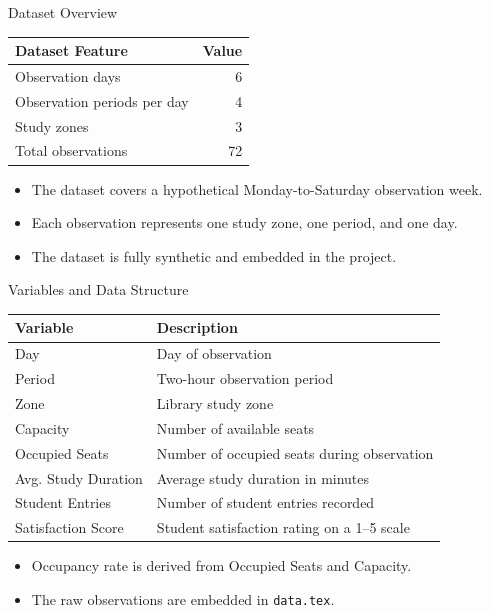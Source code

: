 \documentclass[aspectratio=169,11pt]{beamer}
\begin{document}
\begin{frame}{Dataset Overview}
	\begin{table}
		\centering
		\begin{tabular}{lr}
			\toprule
			\textbf{Dataset Feature} & \textbf{Value} \\
			\midrule
			Observation days & 6 \\
			Observation periods per day & 4 \\
			Study zones & 3 \\
			Total observations & 72 \\
			\bottomrule
		\end{tabular}
	\end{table}
	
	\vspace{0.4cm}
	
	\begin{itemize}
		\item The dataset covers a hypothetical Monday-to-Saturday observation week.
		\item Each observation represents one study zone, one period, and one day.
		\item The dataset is fully synthetic and embedded in the project.
	\end{itemize}
\end{frame}

\begin{frame}{Variables and Data Structure}
	\small
	\begin{table}
		\centering
		\begin{tabular}{p{3.2cm}p{6.8cm}}
			\toprule
			\textbf{Variable} & \textbf{Description} \\
			\midrule
			Day & Day of observation \\
			Period & Two-hour observation period \\
			Zone & Library study zone \\
			Capacity & Number of available seats \\
			Occupied Seats & Number of occupied seats during observation \\
			Avg. Study Duration & Average study duration in minutes \\
			Student Entries & Number of student entries recorded \\
			Satisfaction Score & Student satisfaction rating on a 1--5 scale \\
			\bottomrule
		\end{tabular}
	\end{table}
	
	\vspace{0.2cm}
	
	\begin{itemize}
		\item Occupancy rate is derived from Occupied Seats and Capacity.
		\item The raw observations are embedded in \texttt{data.tex}.
	\end{itemize}
\end{frame}
\end{document}
